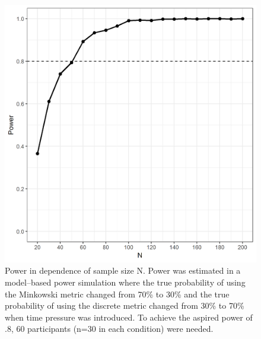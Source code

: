 \documentclass[a4paper,man,natbib]{apa6}
\begin{document}
\begin{figure}
\centering
\includegraphics{fig_power.png}
\caption{Power in dependence of sample size N. Power was estimated in a model--based power simulation \citep{gluth2019importance} where the true probability of using the Minkowski metric changed from 70\% to 30\% and the true probability of using the discrete metric changed from 30\% to 70\% when time pressure was introduced. To achieve the aspired power of .8, 60 participants (n=30 in each condition) were needed.}
\label{fig:power}
\end{figure}
\end{document}
